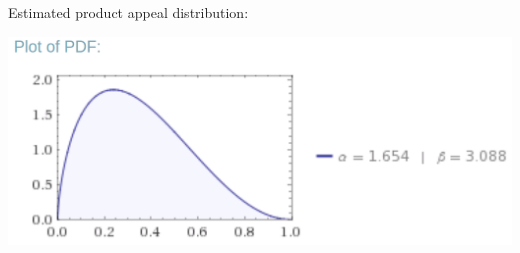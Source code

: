 \documentclass[notes=show]{beamer}
\begin{document}
\begin{frame}

Estimated product appeal distribution:

\begin{center}
    \includegraphics[scale=0.3]{figs/product_appeal_dist.png}
\end{center}

\end{frame}%
\end{document}
